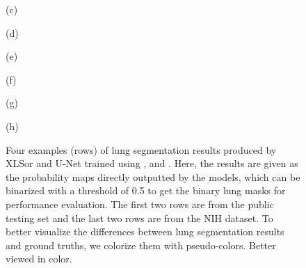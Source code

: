 \documentclass{midl} \usepackage{multirow}
\begin{document}
\begin{figure}[t!]
{	\begin{minipage}[b]{0.12\linewidth}
		\centering
		\vspace{0.2cm}
		\centerline{(c)}\medskip
	\end{minipage}
	\begin{minipage}[b]{0.12\linewidth}
		\centering
		\vspace{0.2cm}
		\centerline{(d)}\medskip
	\end{minipage}
	\begin{minipage}[b]{0.115\linewidth}
		\centering
		\vspace{0.2cm}
		\centerline{(e)}\medskip
	\end{minipage}
	\begin{minipage}[b]{0.12\linewidth}
		\centering
		\vspace{0.2cm}
		\centerline{(f)}\medskip
	\end{minipage}
	\begin{minipage}[b]{0.12\linewidth}
		\centering
		\vspace{0.2cm}
		\centerline{(g)}\medskip
	\end{minipage}
	\begin{minipage}[b]{0.115\linewidth}
		\centering
		\vspace{0.2cm}
		\centerline{(h)}\medskip
	\end{minipage}}
	\caption{Four examples (rows) of lung segmentation results produced by XLSor and U-Net trained using ,  and . Here, the results are given as the probability maps directly outputted by the models, which can be binarized with a threshold of 0.5 to get the binary lung masks for performance evaluation. The first two rows are from the public testing set and the last two rows are from the NIH dataset. To better visualize the differences between lung segmentation results and ground truths, we colorize them with pseudo-colors. Better viewed in color.}
	\label{fig:lung_segmentation}
\end{figure}
\end{document}
